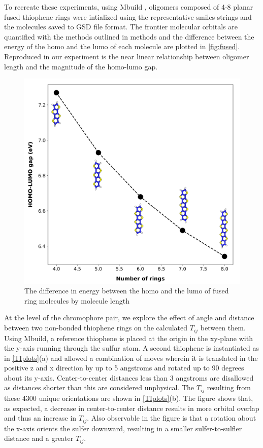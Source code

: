 To recreate these experiments, using Mbuild \cite{Klein2016}, oligomers composed of 4-8 planar fused thiophene rings
were intialized using the representative smiles strings and the molecules saved to GSD file format. The frontier
molecular orbitals are quantified with the methods outlined in methods and the difference between the energy of the
homo and the lumo of each molecule are plotted in \autoref{fig:fused}.
Reproduced in our experiment is the near linear relationship between oligomer length and the magnitude of the
homo-lumo gap.

\begin{figure}
  \center
  \includegraphics[width = .8\textwidth]{figures/fused-ring-figure.png}
  \caption{The difference in energy between the homo and the lumo of fused ring molecules by molecule length}
  \label{fig:fused}
\end{figure}

At the level of the chromophore pair, we explore the effect of angle and distance between two non-bonded
thiophene rings on the calculated $T_{ij}$ between them.
Using Mbuild, a reference thiophene is placed at the origin in the xy-plane
with the y-axis running through the sulfur atom. 
A second thiophene is instantiated as in \autoref{TIplots}(a)
and allowed a combination of moves wherein it is translated
in the positive z and x direction by up to 5 angstroms 
and rotated up to 90 degrees about its y-axis. Center-to-center distances less
than 3 angstroms are disallowed as distances shorter than this are considered
unphysical. The $T_{ij}$ resulting from these 4300 unique orientations are shown in \autoref{TIplots}(b). The figure shows that, as expected, a
decrease in 
center-to-center distance results in more orbital overlap and thus an increase in $T_{ij}$. Also observable in the figure is that
a rotation about the x-axis orients the sulfer downward, resulting in a smaller sulfer-to-sulfler distance 
and a greater $T_{ij}$. 

